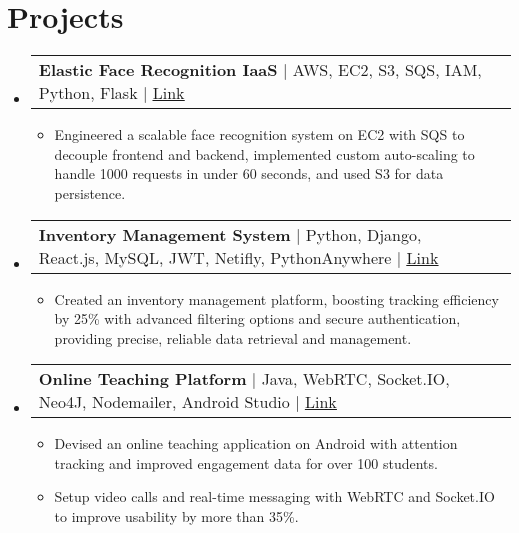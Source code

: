 \documentclass[letterpaper,11pt]{article}
\makeatletter
\newcommand{\resumeItem}[1]{
  \item\footnotesize{
    {#1 \vspace{-2pt}}
  }
}
\newcommand{\resumeProjectHeading}[2]{
    \item
    \begin{tabular*}{1.001\textwidth}{l@{\extracolsep{\fill}}r}
      \small#1 & \textbf{\small #2}\\
    \end{tabular*}\vspace{-7pt}
}
\newcommand{\resumeSubHeadingListStart}{\begin{itemize}[leftmargin=0pt, label={}]}
\newcommand{\resumeSubHeadingListEnd}{\end{itemize}}
\newcommand{\resumeItemListStart}{\begin{itemize}[leftmargin=*]}
\newcommand{\resumeItemListEnd}{\end{itemize}\vspace{-5pt}}
\makeatother
\begin{document}
\section{Projects}
    \vspace{-5pt}
    \resumeSubHeadingListStart
      \resumeProjectHeading
          {\textbf{Elastic Face Recognition IaaS} $|$ AWS, EC2, S3, SQS, IAM, Python, Flask $|$
          \href{https://github.com/freakbeast14/ElastiFace}{\color{blue}\underline{Link}}}{}
          \resumeItemListStart
              \resumeItem{Engineered a scalable face recognition system on EC2 with SQS to decouple frontend and backend, implemented custom auto-scaling to handle 1000 requests in under 60 seconds, and used S3 for data persistence.}
          \resumeItemListEnd 
          \vspace{-13pt}
      \resumeProjectHeading
          {\textbf{Inventory Management System} $|$ Python, Django, React.js, MySQL, JWT, Netifly, PythonAnywhere $|$
          \href{https://github.com/freakbeast14/Kaizntree}{\color{blue}\underline{Link}}}{}
          \resumeItemListStart
              \resumeItem{Created an inventory management platform, boosting tracking efficiency by 25\% with advanced filtering options and secure authentication, providing precise, reliable data retrieval and management.}
          \resumeItemListEnd 
          \vspace{-13pt}
      \resumeProjectHeading
          {\textbf{Online Teaching Platform} $|$ Java, WebRTC, Socket.IO, Neo4J, Nodemailer, Android Studio $|$
          \href{https://github.com/ConnectOrg/connect-web-app}{\color{blue}\underline{Link}}}{}
          \resumeItemListStart
              \resumeItem{Devised an online teaching application on Android with attention tracking and improved engagement data for over 100 students.}
              \resumeItem{Setup video calls and real-time messaging with WebRTC and Socket.IO to improve usability by more than 35\%.}
          \resumeItemListEnd 
    \resumeSubHeadingListEnd
\vspace{-10pt}
\end{document}
